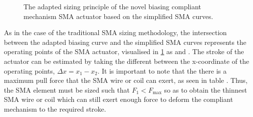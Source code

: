 \begin{figure}[ht] %
  \centering
  \caption{The adapted sizing principle of the novel biasing compliant mechanism SMA actuator based on the simplified SMA curves.}
  \label{fig:smaactwp-pt}
\end{figure}

As in the case of the traditional SMA sizing methodology, the intersection between the adapted biasing curve and the simplified SMA curves represents the operating points of the SMA actuator, visualised in \cref{fig:smaactwp-pt} as  and . The stroke of the actuator can be estimated by taking the different between the x-coordinate of the operating points, $\Delta x = x_1-x_2$. It is important to note that the there is a maximum pull force that the SMA wire or coil can exert, as seen in table \todocite. Thus, the SMA element must be sized such that $F_1 < F_\mathrm{max}$ so as to obtain the thinnest SMA wire or coil which can still exert enough force to deform the compliant mechanism to the required stroke.

